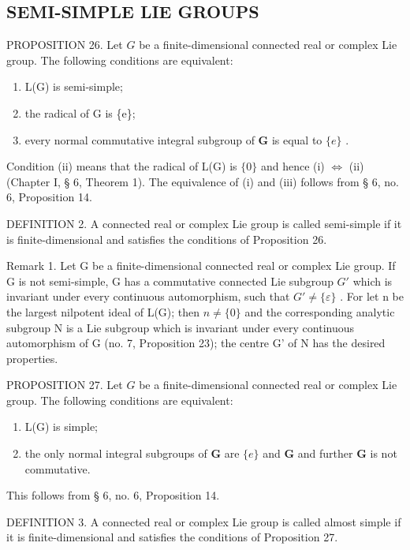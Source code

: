 \subsection{SEMI-SIMPLE LIE GROUPS}

PROPOSITION 26. Let \(G\) be a finite-dimensional connected real or complex Lie group. The following conditions are equivalent:

\begin{enumerate}
\def\labelenumi{(\roman{enumi})}
\item
  L(G) is semi-simple;
\item
  the radical of G is \{e\};
\item
  every normal commutative integral subgroup of \(\mathbf{G}\) is equal to \(\{e\}\) .
\end{enumerate}

Condition (ii) means that the radical of L(G) is \(\{0\}\) and hence (i) \(\Leftrightarrow\) (ii) (Chapter I, § 6, Theorem 1). The equivalence of (i) and (iii) follows from § 6, no. 6, Proposition 14.

DEFINITION 2. A connected real or complex Lie group is called semi-simple if it is finite-dimensional and satisfies the conditions of Proposition 26.

Remark 1. Let G be a finite-dimensional connected real or complex Lie group. If G is not semi-simple, G has a commutative connected Lie subgroup \(G'\) which is invariant under every continuous automorphism, such that \(G' \neq \{\varepsilon\}\) . For let n be the largest nilpotent ideal of L(G); then \(n \neq \{0\}\) and the corresponding analytic subgroup N is a Lie subgroup which is invariant under every continuous automorphism of G (no. 7, Proposition 23); the centre G' of N has the desired properties.

PROPOSITION 27. Let \(G\) be a finite-dimensional connected real or complex Lie group. The following conditions are equivalent:

\begin{enumerate}
\def\labelenumi{(\roman{enumi})}
\item
  L(G) is simple;
\item
  the only normal integral subgroups of \(\mathbf{G}\) are \(\{e\}\) and \(\mathbf{G}\) and further \(\mathbf{G}\) is not commutative.
\end{enumerate}

This follows from § 6, no. 6, Proposition 14.

DEFINITION 3. A connected real or complex Lie group is called almost simple if it is finite-dimensional and satisfies the conditions of Proposition 27.

